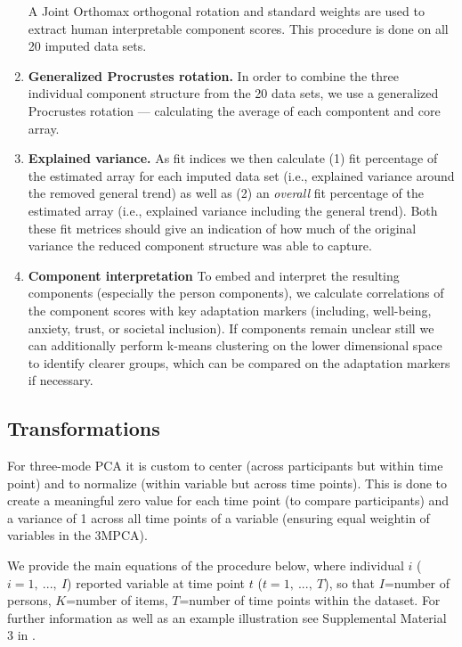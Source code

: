 \documentclass[]{article}
\begin{document}
\begin{enumerate}
  A Joint Orthomax orthogonal rotation and standard weights
   are used to extract human interpretable
  component scores. This procedure is done on all 20 imputed data sets.
\item
  \textbf{Generalized Procrustes rotation.} In order to combine the
  three individual component structure from the 20 data sets, we use a
  generalized Procrustes rotation --- calculating the average of each
  compontent and core array.
\item
  \textbf{Explained variance.} As fit indices we then calculate (1) fit
  percentage of the estimated array for each imputed data set (i.e.,
  explained variance around the removed general trend) as well as (2) an
  \emph{overall} fit percentage of the estimated array (i.e., explained
  variance including the general trend). Both these fit metrices should
  give an indication of how much of the original variance the reduced
  component structure was able to capture.
\item
  \textbf{Component interpretation} To embed and interpret the resulting
  components (especially the person components), we calculate
  correlations of the component scores with key adaptation markers
  (including, well-being, anxiety, trust, or societal inclusion). If
  components remain unclear still we can additionally perform k-means
  clustering on the lower dimensional space to identify clearer groups,
  which can be compared on the adaptation markers if necessary.
\end{enumerate}

\hypertarget{transformations}{%
\subsection{Transformations}\label{transformations}}

\setlength{\abovedisplayskip}{0pt}
\setlength{\belowdisplayskip}{0pt}
\setlength{\abovedisplayshortskip}{0pt}
\setlength{\belowdisplayshortskip}{0pt}

For three-mode PCA it is custom to center (across participants but
within time point) and to normalize (within variable but across time
points). This is done to create a meaningful zero value for each time
point (to compare participants) and a variance of 1 across all time
points of a variable (ensuring equal weightin of variables in the
3MPCA).

We provide the main equations of the procedure below, where individual
\(i\) (\(i = 1,\ ...,\ I\)) reported
variable
at time point \(t\) (\(t = 1,\ ...,\ T\)), so that \(I\)=number of
persons, \(K\)=number of items, \(T\)=number of time points within the
dataset. For further information as well as an example illustration see
Supplemental Material 3 in \citet{Monden2015}.
\end{document}
